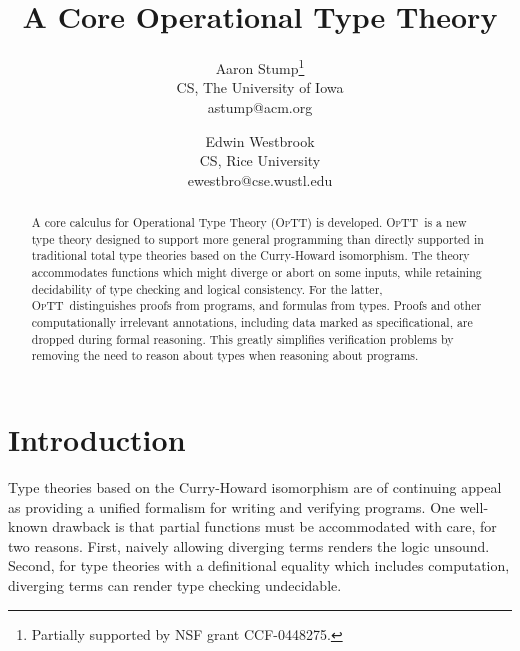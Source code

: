 \documentclass{fundam}
\newcommand{\optt}{\textsc{OpTT}}
\begin{document}
\title{A Core Operational Type Theory}

\author{Aaron Stump\thanks{Partially supported by NSF grant CCF-0448275.} \\
CS, The University of Iowa \\
astump{@}acm.org \\
\and
Edwin Westbrook \\
CS, Rice University \\
ewestbro{@}cse.wustl.edu}





\maketitle


\begin{abstract}
A core calculus for Operational Type Theory (\optt) is developed.
\optt\ is a new type theory designed to support more general
programming than directly supported in traditional total type theories
based on the Curry-Howard isomorphism.   The theory accommodates
functions which might diverge or abort on some inputs, while retaining
decidability of type checking and logical consistency.  For the
latter, \optt\ distinguishes proofs from programs, and formulas from
types.  Proofs and other computationally irrelevant annotations,
including data marked as specificational, are dropped during formal
reasoning.  This greatly simplifies verification problems by removing
the need to reason about types when reasoning about programs.  
\end{abstract}

\section{Introduction}

Type theories based on the Curry-Howard isomorphism are of continuing
appeal as providing a unified formalism for writing and verifying
programs.  One well-known drawback is that partial functions must be
accommodated with care, for two reasons.  First, naively allowing
diverging terms renders the logic unsound.  Second, for type theories
with a definitional equality which includes computation, diverging
terms can render type checking undecidable.
\end{document}
